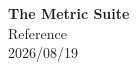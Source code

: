 \documentclass[11pt,a4paper,oneside]{report}
\begin{document}
\thispagestyle{empty}

\vspace*{2.2cm}
\begin{center}
  {\LARGE\bfseries The  Metric Suite}\\[10pt]
  {\Large Reference}\\[22pt]
  {\small 2026/08/19}
\end{center}

\vfill
\clearpage

\tableofcontents
\clearpage
{}

\setcounter{chapter}{-1}

\end{document}
